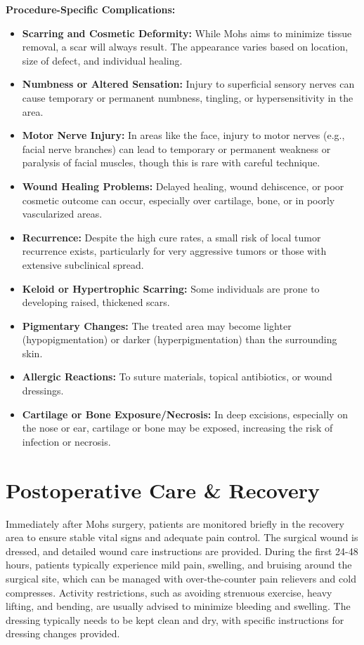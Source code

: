 \textbf{Procedure-Specific Complications:}
\begin{itemize}
  \item \textbf{Scarring and Cosmetic Deformity:} While Mohs aims to minimize tissue removal, a scar will always result. The appearance varies based on location, size of defect, and individual healing.
  
  \item \textbf{Numbness or Altered Sensation:} Injury to superficial sensory nerves can cause temporary or permanent numbness, tingling, or hypersensitivity in the area.
  
  \item \textbf{Motor Nerve Injury:} In areas like the face, injury to motor nerves (e.g., facial nerve branches) can lead to temporary or permanent weakness or paralysis of facial muscles, though this is rare with careful technique.
  
  \item \textbf{Wound Healing Problems:} Delayed healing, wound dehiscence, or poor cosmetic outcome can occur, especially over cartilage, bone, or in poorly vascularized areas.
  
  \item \textbf{Recurrence:} Despite the high cure rates, a small risk of local tumor recurrence exists, particularly for very aggressive tumors or those with extensive subclinical spread.
  
  \item \textbf{Keloid or Hypertrophic Scarring:} Some individuals are prone to developing raised, thickened scars.
  
  \item \textbf{Pigmentary Changes:} The treated area may become lighter (hypopigmentation) or darker (hyperpigmentation) than the surrounding skin.
  
  \item \textbf{Allergic Reactions:} To suture materials, topical antibiotics, or wound dressings.
  
  \item \textbf{Cartilage or Bone Exposure/Necrosis:} In deep excisions, especially on the nose or ear, cartilage or bone may be exposed, increasing the risk of infection or necrosis.
\end{itemize}

\section*{Postoperative Care \& Recovery}
Immediately after Mohs surgery, patients are monitored briefly in the recovery area to ensure stable vital signs and adequate pain control. The surgical wound is dressed, and detailed wound care instructions are provided. During the first 24-48 hours, patients typically experience mild pain, swelling, and bruising around the surgical site, which can be managed with over-the-counter pain relievers and cold compresses. Activity restrictions, such as avoiding strenuous exercise, heavy lifting, and bending, are usually advised to minimize bleeding and swelling. The dressing typically needs to be kept clean and dry, with specific instructions for dressing changes provided.

